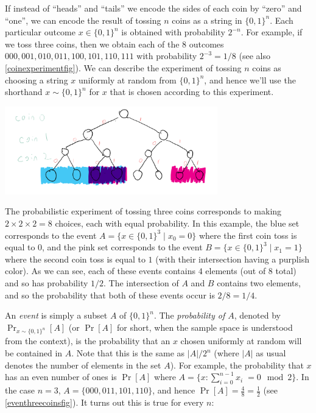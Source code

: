 If instead of ``heads'' and ``tails'' we encode the sides of each coin
by ``zero'' and ``one'', we can encode the result of tossing \(n\) coins
as a string in \(\{0,1\}^n\). Each particular outcome \(x\in \{0,1\}^n\)
is obtained with probability \(2^{-n}\). For example, if we toss three
coins, then we obtain each of the 8 outcomes
\(000,001,010,011,100,101,110,111\) with probability \(2^{-3}=1/8\) (see
also \cref{coinexperimentfig}). We can describe the experiment of
tossing \(n\) coins as choosing a string \(x\) uniformly at random from
\(\{0,1\}^n\), and hence we'll use the shorthand \(x\sim \{0,1\}^n\) for
\(x\) that is chosen according to this experiment.


\begin{marginfigure}
\centering
\includegraphics[width=\linewidth, height=1.5in, keepaspectratio]{../figure/coinexperiment.png}
\caption{The probabilistic experiment of tossing three coins corresponds
to making \(2\times 2 \times 2 = 8\) choices, each with equal
probability. In this example, the blue set corresponds to the event
\(A = \{ x\in \{0,1\}^3 \;|\; x_0 = 0 \}\) where the first coin toss is
equal to \(0\), and the pink set corresponds to the event
\(B = \{ x\in \{0,1\}^3 \;|\; x_1 = 1 \}\) where the second coin toss is
equal to \(1\) (with their intersection having a purplish color). As we
can see, each of these events contains \(4\) elements (out of \(8\)
total) and so has probability \(1/2\). The intersection of \(A\) and
\(B\) contains two elements, and so the probability that both of these
events occur is \(2/8 = 1/4\).}
\label{coinexperimentfig}
\end{marginfigure}

An \emph{event} is simply a subset \(A\) of \(\{0,1\}^n\). The
\emph{probability of \(A\)}, denoted by \(\Pr_{x\sim \{0,1\}^n}[A]\) (or
\(\Pr[A]\) for short, when the sample space is understood from the
context), is the probability that an \(x\) chosen uniformly at random
will be contained in \(A\). Note that this is the same as \(|A|/2^n\)
(where \(|A|\) as usual denotes the number of elements in the set
\(A\)). For example, the probability that \(x\) has an even number of
ones is \(\Pr[A]\) where
\(A=\{ x : \sum_{i=0}^{n-1} x_i \;= 0 \mod 2 \}\). In the case \(n=3\),
\(A=\{ 000,011,101,110 \}\), and hence
\(\Pr[A]=\tfrac{4}{8}=\tfrac{1}{2}\) (see \cref{eventhreecoinsfig}). It
turns out this is true for every \(n\):


